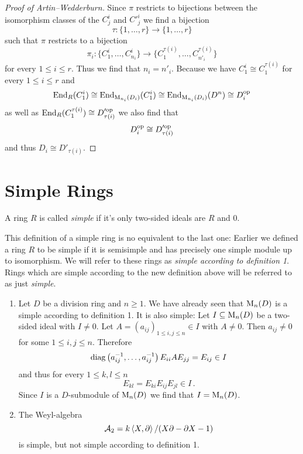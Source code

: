 \begin{proof}[Proof of Artin--Wedderburn]
  Since $\pi$ restricts to bijections between the isomorphism classes of the $C^i_j$ and $C'^i_j$ we find a bijection
  \[
            \tau
    \colon  \{1, \dotsc, r\}
    \to     \{1, \dotsc, r\}
  \]
  such that $\pi$ restricts to a bijection
  \[
            \pi_i
    \colon  \{ C^i_1, \dotsc, C^i_{n_i} \}
    \to     \{ C^{\tau(i)}_1, \dotsc, C^{\tau(i)}_{n'_i} \}
  \]
  for every $1 \leq i \leq r$.
  Thus we find that $n_i = n'_i$.
  Because we have $C^i_1 \cong C^{\tau(i)}_1$ for every $1 \leq i \leq r$ and
  \[
          \operatorname{End}_R(C^i_1)
    \cong \operatorname{End}_{\operatorname{M}_{n_i}(D_i)}(C^i_1)
    \cong \operatorname{End}_{\operatorname{M}_{n_i}(D_i)}(D^n)
    \cong D_i^{\mathrm{op}}
  \]
  as well as $\operatorname{End}_R(C^{\tau(i)}_1) \cong D_{\tau(i)}'^{\mathrm{op}}$ we also find that
  \[
          D_i^{\mathrm{op}}
    \cong D_{\tau(i)}'^{\mathrm{op}}
  \]
  and thus $D_i \cong D'_{\tau(i)}$.
\end{proof}





\section{Simple Rings}


\begin{defi}
  A ring $R$ is called \emph{simple} if it’s only two-sided ideals are $R$ and $0$.
\end{defi}


\begin{warn}
  This definition of a simple ring is no equivalent to the last one:
  Earlier we defined a ring $R$ to be simple if it is semisimple and has precisely one simple module up to isomorphism.
  We will refer to these rings as \emph{simple according to definition 1}.
  Rings which are simple according to the new definition above will be referred to as just \emph{simple}.
\end{warn}


\begin{expls}
  \begin{enumerate}[label=\emph{\alph*)},leftmargin=*]
    \item
      Let $D$ be a division ring and $n \geq 1$.
      We have already seen that $\operatorname{M}_n(D)$ is a simple according to definition 1.
      It is also simple:
      Let $I \subseteq \operatorname{M}_n(D)$ be a two-sided ideal with $I \neq 0$.
      Let $A = (a_{ij})_{1 \leq i,j \leq n} \in I$ with $A \neq 0$.
      Then $a_{ij} \neq 0$ for some $1 \leq i,j \leq n$.
      Therefore
      \[
          \operatorname{diag}\left( a_{ij}^{-1}, \dotsc, a_{ij}^{-1} \right) E_{ii} A E_{jj}
        = E_{ij} \in I
      \]
      and thus for every $1 \leq k,l \leq n$
      \[
            E_{kl}
        =   E_{ki} E_{ij} E_{jl}
        \in I \,.
      \]
      Since $I$ is a $D$-submodule of $\operatorname{M}_n(D)$ we find that $I = \operatorname{M}_n(D)$.
    \item
      The Weyl-algebra
      \[
          \mathcal{A}_2
        = k \left\langle X,\partial \right\rangle / (X \partial - \partial X - 1)
      \]
      is simple, but not simple according to definition 1.
  \end{enumerate}
\end{expls}


